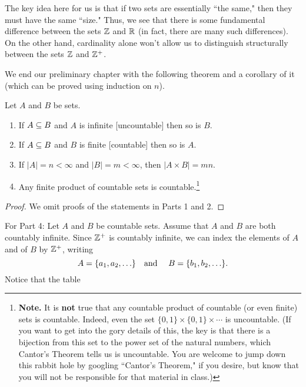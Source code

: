  The key idea here for us is that if two sets are
essentially ``the same," then they must have the same ``size."
Thus, we see that there is some fundamental difference between
the sets $\mathbb{Z}$ and $\mathbb{R}$ (in fact, there are many such
differences). On the other hand, cardinality alone won't allow
us to distinguish structurally between the sets $\mathbb{Z}$ and
$\mathbb{Z}^+$.

We end our preliminary chapter with the following theorem and a corollary of it (which can be proved using induction on $n$).

\begin{thm}\label{cardthm} Let $A$ and $B$ be sets.

\begin{enumerate}
\item If $A\subseteq B$ and $A$ is infinite [uncountable] then so is $B$.

\item If $A\subseteq B$ and $B$ is finite [countable] then so is $A$.

\item If $|A|=n<\infty$ and $|B|=m< \infty$, then $|A\times B|=mn$.

\item Any finite product of countable sets is countable.\footnote{\textbf{Note.} It is \textbf{not} true that any countable product
of countable (or even finite) sets is countable. Indeed, even
the set $\{0,1\}\times \{0,1\}\times \cdots$ is
uncountable. (If you want to get into the gory details
of this, the key is that there is a bijection from this set to
the power set of the natural numbers, which Cantor's Theorem
tells us is uncountable.  You are welcome to jump down this
rabbit hole by googling ``Cantor's Theorem," if you desire, but
know that you will not be responsible for that material in
class.)}

\end{enumerate}

\end{thm}

\begin{proof} We omit proofs of the statements in Parts 1 and 2. \end{proof}

For Part 4: Let $A$ and $B$ be countable sets.  Assume that $A$ and $B$ are both countably infinite. Since $\mathbb{Z}^+$ is countably infinite, we can index the elements of $A$ and of $B$ by $\mathbb{Z}^+$, writing $$A=\{a_1,a_2,\ldots\} \mbox{\quad and \quad} B=\{b_1,b_2,\ldots\}.$$ Notice that the table

